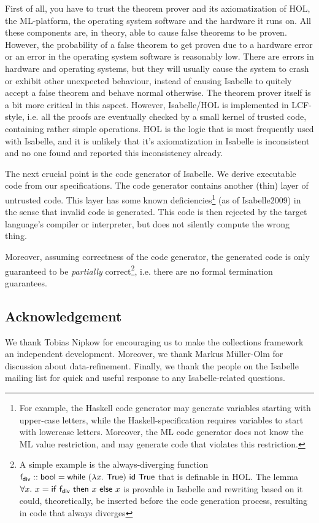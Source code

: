   First of all, you have to trust the theorem prover and its axiomatization of HOL, the ML-platform, the operating system software and the hardware it runs on.
  All these components are, in theory, able to cause false theorems to be proven. However, the probability of a false theorem to get proven due to a hardware error 
  or an error in the operating system software is reasonably low. There are errors in hardware and operating systems, but they will usually cause the system to crash 
  or exhibit other unexpected behaviour, instead of causing Isabelle to quitely accept a false theorem and behave normal otherwise. The theorem prover itself is a bit more critical in this aspect. However, Isabelle/HOL is implemented in LCF-style, i.e. all the proofs are eventually checked by a small kernel of trusted code, containing rather simple operations. HOL is the logic that is most frequently used with Isabelle, and it is unlikely that it's axiomatization in Isabelle is inconsistent and no one found and reported this inconsistency already.

  The next crucial point is the code generator of Isabelle. We derive executable code from our specifications. The code generator contains another (thin) layer of untrusted code. This layer has some known deficiencies\footnote{For example, the Haskell code generator may generate variables starting with upper-case letters, while the Haskell-specification requires variables to start with lowercase letters. Moreover, the ML code generator does not know the ML value restriction, and may generate code that violates this restriction.} (as of Isabelle2009) in the sense that invalid code is generated. This code is then rejected by the target language's compiler or interpreter, but does not silently compute the wrong thing. 

  Moreover, assuming correctness of the code generator, the generated code is only guaranteed to be {\em partially} correct\footnote{A simple example is the always-diverging function ${\sf f_{div}}::{\sf bool} = {\sf while}~(\lambda x.~{\sf True})~{\sf id}~{\sf True}$ that is definable in HOL. The lemma $\forall x.~ x = {\sf if}~{\sf f_{div}}~{\sf then}~x~{\sf else}~x$ is provable in Isabelle and rewriting based on it could, theoretically, be inserted before the code generation process, resulting in code that always diverges}, i.e. there are no formal termination guarantees.

\subsection{Acknowledgement}
We thank Tobias Nipkow for encouraging us to make the collections framework an independent development. Moreover, we thank Markus M\"uller-Olm for discussion about data-refinement. Finally, we thank the people on the Isabelle mailing list for quick and useful response to any Isabelle-related questions.
